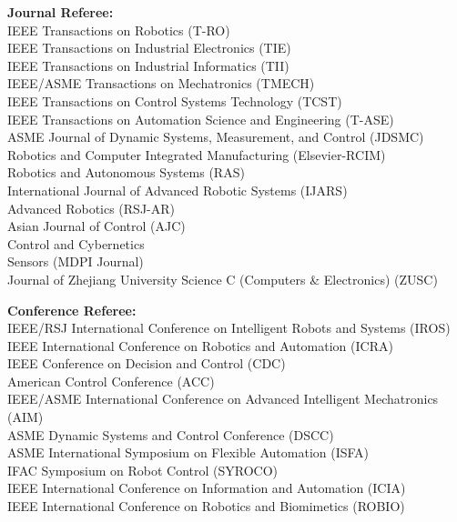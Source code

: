 \documentclass[UTF8,nofonts]{res}
\begin{document}
\begin{resume}
    \textbf{Journal Referee:}\\
    IEEE Transactions on Robotics (T-RO)\\
    IEEE Transactions on Industrial Electronics (TIE)\\
    IEEE Transactions on Industrial Informatics (TII)\\
    IEEE/ASME Transactions on Mechatronics (TMECH)\\
    IEEE Transactions on Control Systems Technology (TCST)\\
    IEEE Transactions on Automation Science and Engineering (T-ASE)\\
    ASME Journal of Dynamic Systems, Measurement, and Control (JDSMC)\\
    Robotics and Computer Integrated Manufacturing (Elsevier-RCIM)\\
    Robotics and Autonomous Systems (RAS)\\
    International Journal of Advanced Robotic Systems (IJARS)\\
    Advanced Robotics (RSJ-AR)\\
    Asian Journal of Control (AJC)\\
    Control and Cybernetics\\
    Sensors (MDPI Journal)\\
    Journal of Zhejiang University Science C (Computers \& Electronics) (ZUSC)


    \textbf{Conference Referee:}\\
    IEEE/RSJ International Conference on Intelligent Robots and Systems (IROS)\\
    IEEE International Conference on Robotics and Automation (ICRA)\\
    IEEE Conference on Decision and Control (CDC)\\
    American Control Conference (ACC)\\
    IEEE/ASME International Conference on Advanced Intelligent Mechatronics (AIM)\\
    ASME Dynamic Systems and Control Conference (DSCC)\\
    ASME International Symposium on Flexible Automation (ISFA)\\
    IFAC Symposium on Robot Control (SYROCO)\\
    IEEE International Conference on Information and Automation (ICIA)\\
    IEEE International Conference on Robotics and Biomimetics (ROBIO)


\end{resume}
\end{document}
